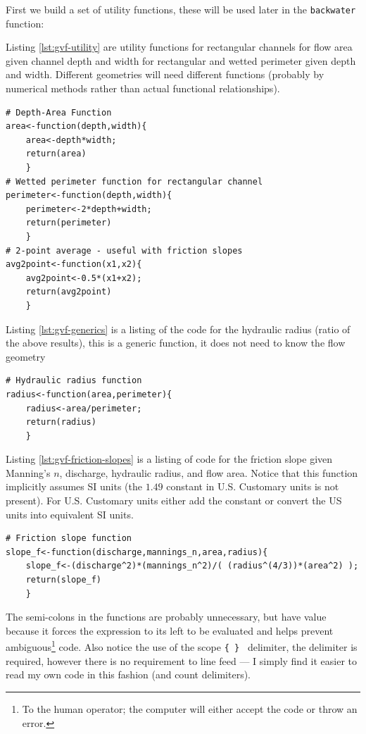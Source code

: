 First we build a set of utility functions, these will be used later in the \texttt{backwater} function:  

Listing \ref{lst:gvf-utility} are utility functions for rectangular channels for flow area given channel depth and width for rectangular and wetted perimeter given depth and width. 
Different geometries will need different functions (probably by numerical methods rather than actual functional relationships).
\begin{lstlisting}[caption=R Code for prototype hydraulic support functions (for rectangular channels) \\ , label=lst:gvf-utility]
# Depth-Area Function
area<-function(depth,width){
	area<-depth*width;
	return(area)
	}
# Wetted perimeter function for rectangular channel
perimeter<-function(depth,width){
	perimeter<-2*depth+width;
	return(perimeter)
	}
# 2-point average - useful with friction slopes
avg2point<-function(x1,x2){
	avg2point<-0.5*(x1+x2);
	return(avg2point)
	}
\end{lstlisting}   

Listing \ref{lst:gvf-generics} is a listing of the code for the hydraulic radius (ratio of the above results), this is a generic function, it does not need to know the flow geometry

\begin{lstlisting}[caption=R Code for prototype hydraulic radius function \\ , label=lst:gvf-generics]
# Hydraulic radius function
radius<-function(area,perimeter){
	radius<-area/perimeter;
	return(radius)
	}
\end{lstlisting}  

Listing \ref{lst:gvf-friction-slopes} is a listing of code for the friction slope given Manning's $n$, discharge, hydraulic radius, and flow area.  
Notice that this function implicitly assumes SI units (the $1.49$ constant in U.S. Customary units is not present).
For U.S. Customary units either add the constant or convert the US units into equivalent SI units.

\begin{lstlisting}[caption=R Code for prototype friction slope function) \\ , label=lst:gvf-friction-slopes]
# Friction slope function
slope_f<-function(discharge,mannings_n,area,radius){
	slope_f<-(discharge^2)*(mannings_n^2)/( (radius^(4/3))*(area^2) ); 
	return(slope_f)
	}
\end{lstlisting} 

The semi-colons in the functions are probably unnecessary, but have value because it forces the expression to its left to be evaluated and helps prevent ambiguous\footnote{To the human operator; the computer will either accept the code or throw an error.} code.  Also notice the use of the scope \texttt{\{  \} } delimiter, the delimiter is required, however there is no requirement to line feed --- I simply find it easier to read my own code in this fashion (and count delimiters).

